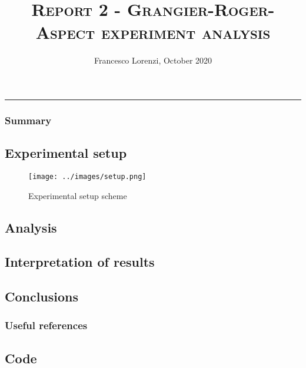 \documentclass[10pt, a4paper, draft]{article}
\title{\textsc{Report 2 - Grangier-Roger-Aspect experiment analysis}}
\author{Francesco Lorenzi,      October 2020}
\date{}
\renewcommand{\baselinestretch}{1}
\begin{document}
\maketitle
\vspace{-25pt}

\begin{center}
	\rule[0pt]{400pt}{0.5pt}
\end{center}
\vspace{-15pt}

\begin{multicols}{2}
\subsubsection*{Summary}


\subsection*{Experimental setup}

\begin{mdframed}
    \begin{figure}[H]
    \centering
    \texttt{[image: ../images/setup.png]}
    \caption{Experimental setup scheme}
  \end{figure}
\end{mdframed}
 
\subsection*{Analysis}

\subsection*{Interpretation of results}

\subsection*{Conclusions}

\subsubsection*{Useful references}

\end{multicols}

\hrulefill
\subsection*{Code}

\renewcommand{\baselinestretch}{0.5}
\begin{mdframed}
  \begin{lstlisting}
  \end{lstlisting}
\end{mdframed}
\end{document}
